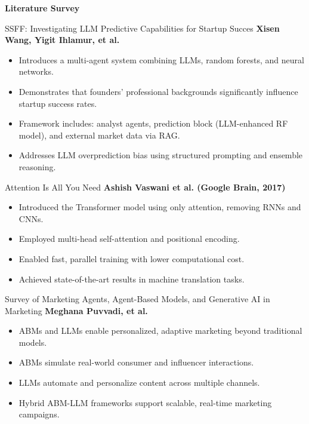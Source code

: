 \documentclass{beamer}
\begin{document}
\begin{frame}
\centering
\Huge \textbf{Literature Survey}
\end{frame}


\begin{frame}{SSFF: Investigating LLM Predictive Capabilities for Startup Succes}
\large\textbf{Xisen Wang, Yigit Ihlamur, et al.}

\normalsize
\begin{itemize}
  \item Introduces a multi-agent system combining LLMs, random forests, and neural networks.
    \item Demonstrates that founders' professional backgrounds significantly influence startup success rates.

    \item Framework includes: analyst agents, prediction block (LLM-enhanced RF model), and external market data via RAG.
    \item Addresses LLM overprediction bias using structured prompting and ensemble reasoning.
\end{itemize}

\end{frame}

\begin{frame}{Attention Is All You Need}
\large\textbf{Ashish Vaswani et al. (Google Brain, 2017)}

\normalsize
\begin{itemize}
  \item Introduced the Transformer model using only attention, removing RNNs and CNNs.
    \item Employed multi-head self-attention and positional encoding.
    \item Enabled fast, parallel training with lower computational cost.
    \item Achieved state-of-the-art results in machine translation tasks.
\end{itemize}
\end{frame}


\begin{frame}{Survey of Marketing Agents, Agent-Based Models, and Generative AI in Marketing    }
\large\textbf{Meghana Puvvadi, et al.}

\normalsize
\begin{itemize}
   \item ABMs and LLMs enable personalized, adaptive marketing beyond traditional models.
    \item ABMs simulate real-world consumer and influencer interactions.
    \item LLMs automate and personalize content across multiple channels.
    \item Hybrid ABM-LLM frameworks support scalable, real-time marketing campaigns.
\end{itemize}
\end{frame}
\end{document}
